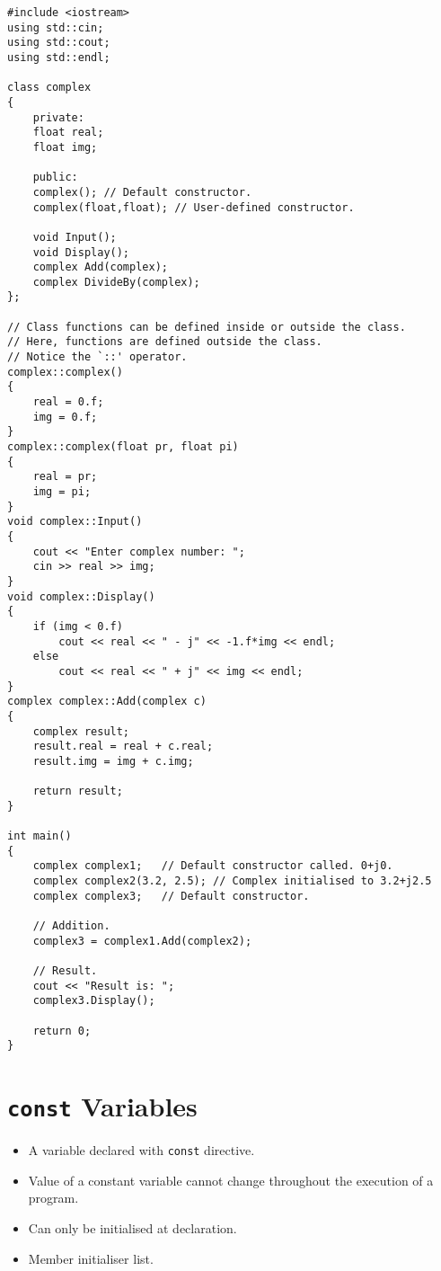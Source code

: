\documentclass[12pt,a4paper]{article}
\begin{document}
\begin{lstlisting}[caption={Default and User--Defined Constructor}]
#include <iostream>
using std::cin;
using std::cout;
using std::endl;

class complex
{
	private:
	float real;
	float img;
	
	public:
	complex(); // Default constructor.
	complex(float,float); // User-defined constructor.
	
	void Input();
	void Display();
	complex Add(complex);
	complex DivideBy(complex);
};

// Class functions can be defined inside or outside the class.
// Here, functions are defined outside the class.
// Notice the `::' operator.
complex::complex()
{
	real = 0.f;
	img = 0.f;
}
complex::complex(float pr, float pi)
{
	real = pr;
	img = pi;
}
void complex::Input()
{
	cout << "Enter complex number: ";
	cin >> real >> img;
}
void complex::Display()
{
	if (img < 0.f)
		cout << real << " - j" << -1.f*img << endl;
	else
		cout << real << " + j" << img << endl;
}
complex complex::Add(complex c)
{
	complex result;
	result.real = real + c.real;
	result.img = img + c.img;
	
	return result;
}

int main()
{
	complex complex1;	// Default constructor called. 0+j0.
	complex complex2(3.2, 2.5); // Complex initialised to 3.2+j2.5
	complex complex3;	// Default constructor.
	
	// Addition.
	complex3 = complex1.Add(complex2);
	
	// Result.
	cout << "Result is: ";
	complex3.Display();
	
	return 0;
}
\end{lstlisting}
\section{\texttt{const} Variables}
\begin{itemize}
\item A variable declared with \verb|const| directive.
\item Value of a constant variable cannot change throughout the execution of a program.
\item Can only be initialised at declaration.
\item Member initialiser list.
\end{itemize}
%
%
\end{document}

